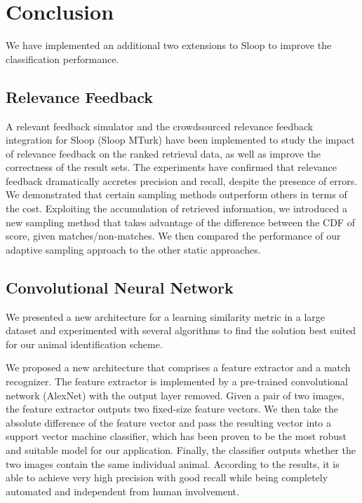 \chapter{Conclusion}

We have implemented an additional two extensions to Sloop to improve the
classification performance.

\section{Relevance Feedback}
A relevant feedback simulator and the crowdsourced
relevance feedback integration for Sloop (Sloop MTurk) have been implemented to
study the impact of relevance feedback on the ranked retrieval data, as well as
improve the correctness of the result sets. The experiments have confirmed that
relevance feedback dramatically accretes precision and recall, despite the
presence of errors. We demonstrated that certain sampling methods outperform others in terms
of the cost. Exploiting the accumulation of retrieved information, we
introduced a new sampling method that takes advantage of the difference between
the CDF of score, given matches/non-matches. We then compared the performance of
our adaptive sampling approach to the other static approaches.

\section{Convolutional Neural Network}

We presented a new architecture for a learning similarity metric in a large
dataset and experimented with several algorithms to find the solution best
suited for our animal identification scheme. 

We proposed a new architecture that comprises a feature extractor and a match
recognizer. The feature extractor is implemented by a pre-trained convolutional
network (AlexNet) with the output layer removed. Given a pair of two images,
the feature extractor outputs two fixed-size feature vectors. We then take the
absolute difference of the feature vector and pass the resulting vector into a
support vector machine classifier, which has been proven to be the most robust and
suitable model for our application. Finally, the classifier outputs whether the
two images contain the same individual animal. According to the results, it
is able to achieve very high precision with good recall while being completely
automated and independent from human involvement. 

